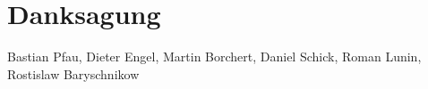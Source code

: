 \chapter*{Danksagung}
Bastian Pfau, Dieter Engel, Martin Borchert, Daniel Schick, Roman Lunin, Rostislaw Baryschnikow